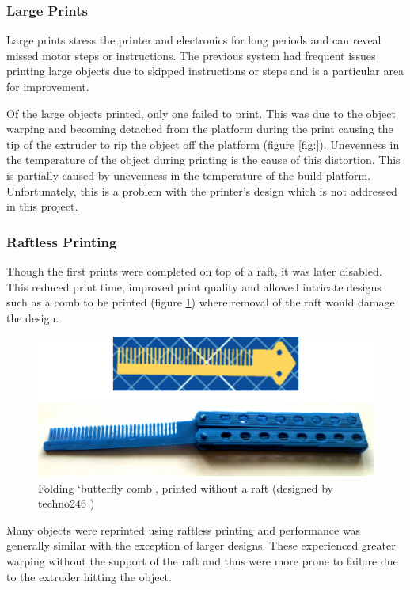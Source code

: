 			\subsubsection{Large Prints}
				
				
				Large prints stress the printer and electronics for long periods and can
				reveal missed motor steps or instructions. The previous system had
				frequent issues printing large objects due to skipped instructions or
				steps and is a particular area for improvement.
				
				Of the large objects printed, only one failed to print. This was due to
				the object warping and becoming detached from the platform during the
				print causing the tip of the extruder to rip the object off the platform
				(figure \ref{fig:}). Unevenness in the temperature of the object during
				printing is the cause of this distortion. This is partially caused by
				unevenness in the temperature of the build platform. Unfortunately, this
				is a problem with the printer's design which is not addressed in this
				project.
				
				
			
			\subsubsection{Raftless Printing}
				
				Though the first prints were completed on top of a raft, it was later
				disabled. This reduced print time, improved print quality and allowed
				intricate designs such as a comb to be printed (figure \ref{fig:comb})
				where removal of the raft would damage the design.
				
				\begin{figure}
					\includegraphics[width=1\textwidth]{diagrams/comb.pdf}
					\caption{Folding `butterfly comb', printed without a raft (designed by
					         techno246 \cite{butterflycomb})}
					\label{fig:comb}
				\end{figure}
				
				Many objects were reprinted using raftless printing and performance was
				generally similar with the exception of larger designs. These
				experienced greater warping without the support of the raft and thus
				were more prone to failure due to the extruder hitting the object.
				
